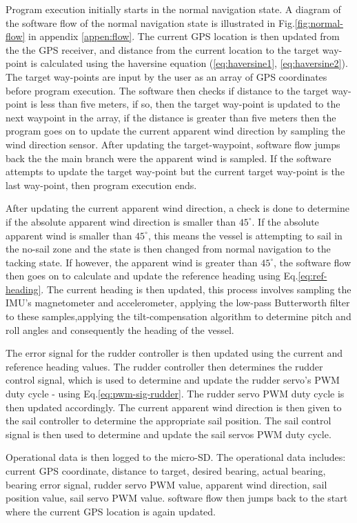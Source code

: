 Program execution initially starts in the normal navigation state.  A diagram of the software flow of the normal navigation state is illustrated in Fig.\ref{fig:normal-flow} in appendix
 \ref{appen:flow}. The current GPS location is then updated from the the GPS receiver, and 
distance from the current location to the target way-point is calculated using the haversine equation (\ref{eq:haversine1}, \ref{eq:haversine2}). The target way-points are input by the user as 
an array of GPS coordinates before program execution. The software then checks if distance to the target way-point is less than five meters, if so, then the target way-point is updated to 
the next waypoint in the array, if the distance is greater than five meters then the program goes on to update the current apparent wind direction by sampling the wind direction sensor. After 
updating the target-waypoint, software flow jumps back the the main branch were the apparent wind is sampled. If the software attempts to update the target way-point but the current target 
way-point is the last way-point, then program execution ends.

After updating the current apparent wind direction, a check is done to determine if the absolute apparent wind direction is smaller than $45^{\circ}$. If the absolute apparent wind is smaller 
than $45^{\circ}$, this means the vessel is attempting to sail in the no-sail zone and the state is then changed from normal navigation to the tacking state. If however, the apparent wind is 
greater than $45^{\circ}$, the software flow then goes on to calculate and update the reference heading using Eq.\ref{eq:ref-heading}. The current heading is then updated, this process involves
sampling the IMU's magnetometer and accelerometer, applying the low-pass Butterworth filter to these samples,applying the tilt-compensation algorithm to determine pitch and roll angles and 
consequently the heading of the vessel. 

The error signal for the rudder controller is then updated using the current and reference heading values. The rudder controller then determines the rudder control signal, which is used to 
determine and update the rudder servo's PWM duty cycle - using Eq.\ref{eq:pwm-sig-rudder}. The rudder servo PWM duty cycle is then updated accordingly. The current apparent wind direction
is then given to the sail controller to determine the appropriate sail position. The sail control signal is then used to determine and update the sail servos PWM duty cycle.

Operational data is then logged to the micro-SD. The operational data includes: current GPS coordinate, distance to target, desired bearing, actual bearing, bearing error signal, 
rudder servo PWM value, apparent wind direction, sail position value, sail servo PWM value. software flow then jumps back to the start where the current GPS location is again updated.

